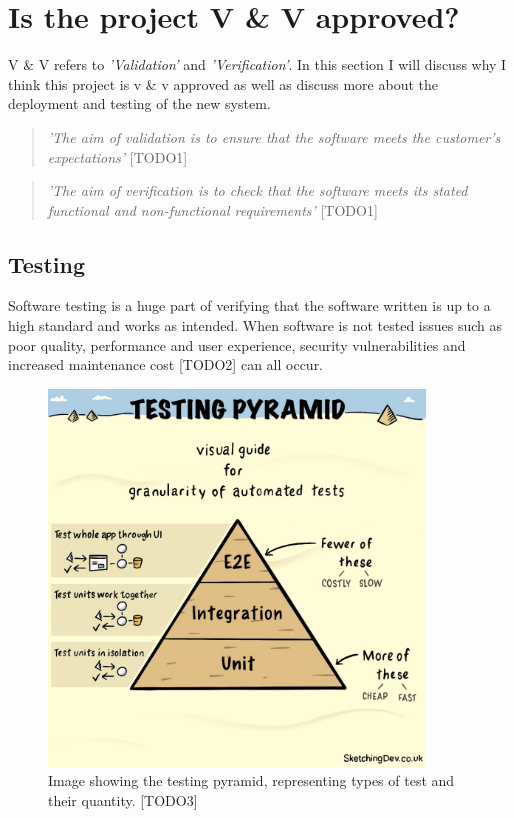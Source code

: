 \section{Is the project V \& V approved?}
  V \& V refers to \textit{'Validation'} and \textit{'Verification'}. In this section I will discuss why I think this project is v \&
  v approved as well as discuss more about the deployment and testing of the new system.

  \begin{quote}
    \textit{'The aim of validation is to ensure that the software meets the customer's expectations'} [TODO1]
  \end{quote}

  \begin{quote}
    \textit{'The aim of verification is to check that the software meets its stated functional and non-functional requirements'} [TODO1]
  \end{quote}

  \subsection{Testing}

  Software testing is a huge part of verifying that the software written is up to a high standard and works as intended. When software is not
  tested issues such as poor quality, performance and user experience, security vulnerabilities and increased maintenance cost [TODO2] can all 
  occur.

  \begin{figure}[H]
    \centering
    \includegraphics[width=10cm]{assets/testingPyramid.jpg}
    \caption{Image showing the testing pyramid, representing types of test and their quantity. [TODO3]}
    \label{fig:testingPyramid}
  \end{figure}


